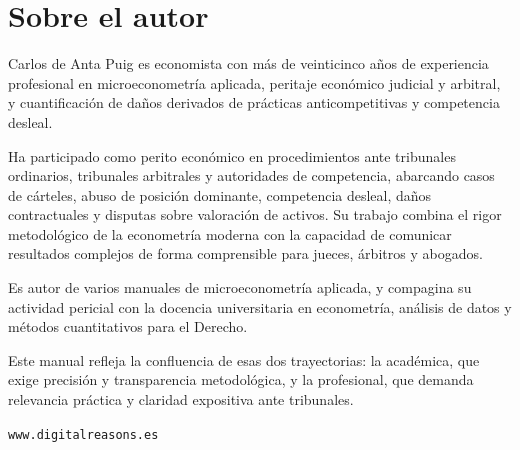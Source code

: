\chapter*{Sobre el autor}

Carlos de Anta Puig es economista con más de veinticinco años de experiencia profesional en microeconometría aplicada, peritaje económico judicial y arbitral, y cuantificación de daños derivados de prácticas anticompetitivas y competencia desleal.

Ha participado como perito económico en procedimientos ante tribunales ordinarios, tribunales arbitrales y autoridades de competencia, abarcando casos de cárteles, abuso de posición dominante, competencia desleal, daños contractuales y disputas sobre valoración de activos. Su trabajo combina el rigor metodológico de la econometría moderna con la capacidad de comunicar resultados complejos de forma comprensible para jueces, árbitros y abogados.

Es autor de varios manuales de microeconometría aplicada, y compagina su actividad pericial con la docencia universitaria en econometría, análisis de datos y métodos cuantitativos para el Derecho.

Este manual refleja la confluencia de esas dos trayectorias: la académica, que exige precisión y transparencia metodológica, y la profesional, que demanda relevancia práctica y claridad expositiva ante tribunales.

\vfill

\begin{center}
\texttt{www.digitalreasons.es}
\end{center}

\clearpage
